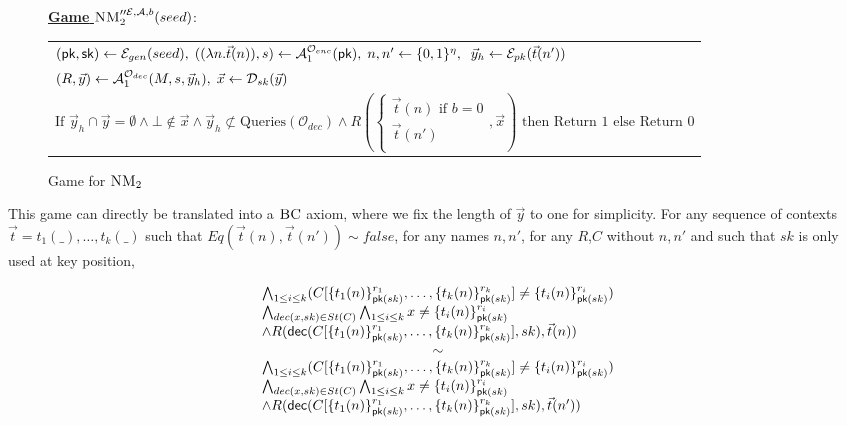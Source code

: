 \begin{figure}[h!]
  \vspace{-1em}
  \centering

        \underline{\textbf{Game}
        $\textsc{NM}_2''^{\mathcal{E},\mathcal{A},b}(seed)$}: \\
        \begin{tabular}{l}
          $(\textsf{pk},\textsf{sk}) \leftarrow \mathcal{E}_{gen}(seed),\; ((\lambda n. \vec{t}(n)),s) \leftarrow \mathcal{A}_1^{\mathcal{O}_{enc}}(\textsf{pk}),\; n,n'\leftarrow \{0,1\}^\eta,\;
  \; \vec{y}_h \leftarrow \mathcal{E}_{pk}(\vec{t}(n'))$\\
          $(R,\vec{y}) \leftarrow \mathcal{A}_1^{\mathcal{O}_{dec}}(M,s,\vec{y}_h),\; \vec{x} \leftarrow \mathcal{D}_{sk}(\vec{y})$ \\
          $\text{If } \vec{y}_h \cap \vec{y} = \emptyset \wedge \bot \notin \vec{x} \wedge \vec{y}_h \not \subset \text{Queries}(\mathcal{O}_{dec}) \wedge R( \begin{cases} \vec{t}(n) \text{ if } b=0 \\  \vec{t}(n')\\ \end{cases},\vec{x}) \text{ then Return } 1 \text{ else Return } 0$
        \end{tabular}
  \caption{Game for $\textsc{NM}_2$}
  \label{fig:nmfinal}
\end{figure}

This game can directly be translated into a $\textsc{BC}$ axiom, where we fix the length of $\vec{y}$ to one for simplicity. For any sequence of contexts $\vec{t}=t_1(\_),\ldots,t_k(\_)$ such that $ Eq(\vec{t}(n),\vec{t}(n')) \sim false$, for any names $n, n'$, for any $R$,$C$ without $n,n'$ and such that $sk$ is only used at key position,

\[
  \begin{array}{l}


 \bigwedge_{1 \leq i \leq k}( C[\myenc{t_1(n)}{r_1}{sk},\ldots,\myenc{t_k(n)}{r_k}{sk}] \not = \myenc{t_i(n)}{r_i}{sk} )      \\
 \bigwedge_{ dec(x,sk) \in St(C) }  \bigwedge_{1 \leq i \leq k} x \not = \myenc{t_i(n)}{r_i}{sk} \\
\wedge R( \mydec(C[\myenc{t_1(n)}{r_1}{sk},\ldots,\myenc{t_k(n)}{r_k}{sk}],sk),\vec{t}(n)) \\
\multicolumn{1}{c}{\sim}\\

 \bigwedge_{1 \leq i \leq k}( C[\myenc{t_1(n)}{r_1}{sk},\ldots,\myenc{t_k(n)}{r_k}{sk}] \not = \myenc{t_i(n)}{r_i}{sk} )      \\
 \bigwedge_{ dec(x,sk) \in St(C) }  \bigwedge_{1 \leq i \leq k} x \not = \myenc{t_i(n)}{r_i}{sk} \\
\wedge R( \mydec(C[\myenc{t_1(n)}{r_1}{sk},\ldots,\myenc{t_k(n)}{r_k}{sk}],sk),\vec{t}(n')) \\
  \end{array}
  \]

